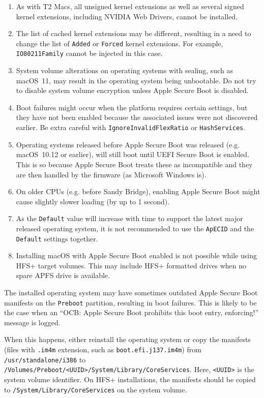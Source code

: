\documentclass[]{article}
\providecommand{\tightlist}{%
  \setlength{\itemsep}{0pt}\setlength{\parskip}{0pt}}
\begin{document}
\begin{enumerate}
  \begin{enumerate}
    \tightlist
    \item As with T2 Macs, all unsigned kernel extensions as well as several
      signed kernel extensions, including NVIDIA Web Drivers, cannot be installed.
    \item The list of cached kernel extensions may be different, resulting in a need
      to change the list of \texttt{Added} or \texttt{Forced} kernel extensions.
      For example, \texttt{IO80211Family} cannot be injected in this case.
    \item System volume alterations on operating systems with sealing, such as
      macOS~11, may result in the operating system being unbootable. Do not
      try to disable system volume encryption unless Apple Secure Boot is disabled.
    \item Boot failures might occur when the platform requires certain settings,
      but they have not been enabled because the associated issues were not discovered earlier.
      Be extra careful with \texttt{IgnoreInvalidFlexRatio} or \texttt{HashServices}.
    \item Operating systems released before Apple Secure Boot was released (e.g.
      macOS~10.12 or earlier), will still boot until UEFI Secure Boot is enabled.
      This is so because Apple Secure Boot treats these as incompatible
      and they are then handled by the firmware (as Microsoft Windows is).
    \item On older CPUs (e.g. before Sandy Bridge), enabling Apple Secure Boot
      might cause slightly slower loading (by up to 1 second).
    \item As the \texttt{Default} value will increase with time to support the latest
      major released operating system, it is not recommended to use the \texttt{ApECID}
      and the \texttt{Default} settings together.
    \item Installing macOS with Apple Secure Boot enabled is not possible while using HFS+
      target volumes. This may include HFS+ formatted drives when no spare APFS drive is available.
  \end{enumerate}

  The installed operating system may have sometimes outdated Apple Secure Boot manifests
  on the \texttt{Preboot} partition, resulting in boot failures. This is likely to be the
  case when an ``OCB: Apple Secure Boot prohibits this boot entry, enforcing!'' message
  is logged.

  When this happens, either reinstall the operating
  system or copy the manifests (files with \texttt{.im4m} extension, such as
  \texttt{boot.efi.j137.im4m}) from \texttt{/usr/standalone/i386} to
  \texttt{/Volumes/Preboot/<UUID>/System/Library/CoreServices}. Here, \texttt{<UUID>}
  is the system volume identifier. On HFS+ installations, the manifests should be
  copied to \texttt{/System/Library/CoreServices} on the system volume.


\end{enumerate}
\end{document}
